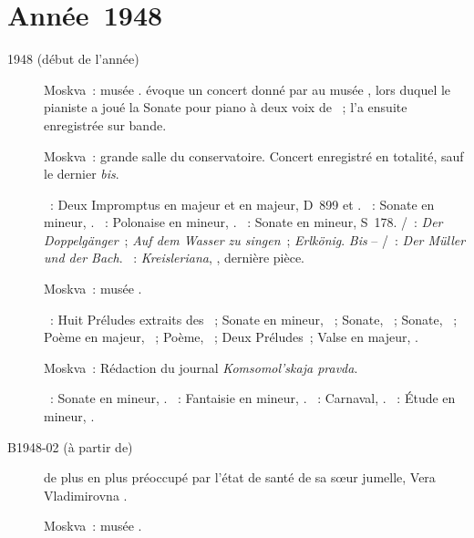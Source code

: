 \section{Année~1948}

\begin{description}
 \item[1948 (début de l'année)]
 Moskva~: musée \Scriabine{}.
 \citet{Bogdanov67a} évoque un concert donné par \VSofronitsky{} au musée
 \Scriabine{}, lors duquel le pianiste a joué la Sonate pour piano à deux
 voix de \VBogdanovBerezovsky{}~; \Sofronitsky{} l'a ensuite enregistrée sur
 bande.
 \item[]
 Moskva~: grande salle du conservatoire.
 Concert enregistré en totalité, sauf le dernier \emph{bis}.

 \textsc{\Schubert{}}~: Deux Impromptus en \kG \Flat majeur et en \kA \Flat
 majeur, D~899  et .
 \textsc{\Schumann{}}~: Sonate en \kF \Sharp mineur, .
 \textsc{\Chopin{}}~: Polonaise en \kF \Sharp mineur, .
 \textsc{\Liszt{}}~: Sonate en \kB mineur, S~178.
 \textsc{\Schubert{}/\Liszt{}}~: \emph{Der Doppelgänger}~; \emph{Auf dem
 Wasser zu singen}~; \emph{Erlkönig}.
 \emph{Bis} -- \textsc{\Schubert{}/\Liszt{}}~: \emph{Der Müller und der
 Bach}.
 \textsc{\Schumann{}}~: \emph{Kreisleriana}, , dernière pièce.
 \item[]
 Moskva~: musée \Scriabine{}.

 \textsc{\Scriabine{}}~: Huit Préludes extraits des ~; Sonate en \kF \Sharp mineur, ~; Sonate, ~;
 Sonate, ~; Poème en \kF \Sharp majeur,  ~;
 Poème,  ~; Deux Préludes~; Valse en \kA \Flat majeur,
 .
 \item[]
 Moskva~: Rédaction du journal \emph{Komsomol'skaja pravda}.

 \textsc{\Beethoven{}}~: Sonate en \kF mineur, .
 \textsc{\Chopin{}}~: Fantaisie en \kF mineur, .
 \textsc{\Schumann{}}~: Carnaval, .
 \textsc{\Scriabine{}}~: Étude en \kD \Sharp mineur,  .
 \item[B1948-02 (à partir de)]
 \VSofronitsky{} de plus en plus préoccupé par l'état de santé de sa sœur
 jumelle, Vera Vladimirovna \citep[p.~168]{Nekrasova08}.
 \item[]
 Moskva~: musée \Scriabine{}.


\end{description}
